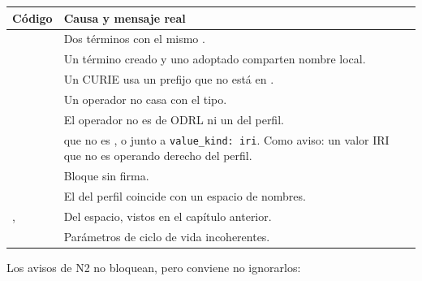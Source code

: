 \begin{longtable}{@{}L{6.3cm}L{9.3cm}@{}}
\toprule
\textbf{Código} & \textbf{Causa y mensaje real} \\
\midrule
\endhead
{} & Dos términos con el mismo .  \\
 & Un término creado y uno adoptado comparten nombre local.  \\
 & Un CURIE usa un prefijo que no está en .  \\
 & Un operador no casa con el tipo.   \\
 & El operador no es de ODRL ni un  del perfil. \\
 &  que no es , o  junto a \texttt{value\_kind: iri}. Como aviso: un valor IRI que no es operando derecho del perfil. \\
 & Bloque  sin firma.  \\
 & El  del perfil coincide con un espacio de nombres. \\
,  & Del espacio, vistos en el capítulo anterior. \\
 & Parámetros de ciclo de vida incoherentes. \\
\bottomrule
\end{longtable}

Los avisos de N2 no bloquean, pero conviene no ignorarlos:

